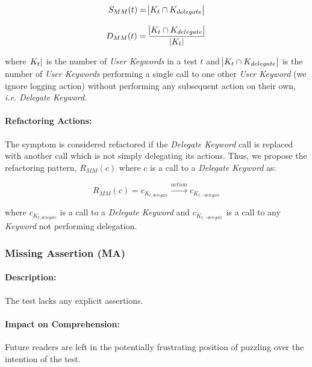 \begin{equation*}
    S_{MM}(t) = \abs{K_{t} \cap K_{delegate}}
\end{equation*}

\begin{equation*}
    D_{MM}(t) = \frac{\abs{K_{t} \cap K_{delegate}}}{\abs{K_{t}}}
\end{equation*}

where $\abs{K_{t}}$ is the number of \emph{User Keywords} in a test $t$ and $\abs{K_{t} \cap K_{delegate}}$ is the number of \emph{User Keywords} performing a single call to one other \emph{User Keyword} (we ignore logging action) without performing any subsequent action on their own, \emph{i.e.} \emph{Delegate Keyword}.

\paragraph{Refactoring Actions:}

The symptom is considered refactored if the \emph{Delegate Keyword} call is replaced with another call which is not simply delegating its actions. Thus, we propose the refactoring pattern, $R_{MM}(c)$ where $c$ is a call to a \emph{Delegate Keyword} as:

\begin{equation*}
    R_{MM}(c) = c_{K_{t, delegate}} \xrightarrow{action} c_{K_{t, \neg delegate}}
\end{equation*}

where $c_{K_{t, delegate}}$ is a call to a \emph{Delegate Keyword} and $c_{K_{t, \neg delegate}}$ is a call to any \emph{Keyword} not performing delegation.

\subsubsection{Missing Assertion (MA)}

\paragraph{Description:}

The test lacks any explicit assertions.

\paragraph{Impact on Comprehension:} 

Future readers are left in the potentially frustrating position of puzzling over the intention of the test.


